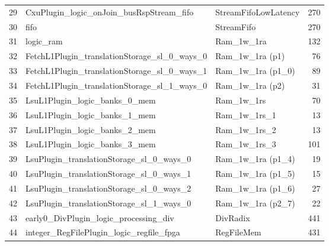 \begin{table}[!htbp]
\begin{tabular}{rllr}
29 & \quad\quad\quad CxuPlugin\_logic\_onJoin\_busRspStream\_fifo        & StreamFifoLowLatency                             &    270 \\
30 & \quad\quad\quad\quad fifo                                           & StreamFifo                                       &    270 \\
31 & \quad\quad\quad\quad\quad logic\_ram                                & Ram\_1w\_1ra                                     &    132 \\
32 & \quad\quad\quad FetchL1Plugin\_translationStorage\_sl\_0\_ways\_0   & Ram\_1w\_1ra (p1)                                &     76 \\
33 & \quad\quad\quad FetchL1Plugin\_translationStorage\_sl\_0\_ways\_1   & Ram\_1w\_1ra (p1\_0)                             &     89 \\
34 & \quad\quad\quad FetchL1Plugin\_translationStorage\_sl\_1\_ways\_0   & Ram\_1w\_1ra (p2)                                &     31 \\
35 & \quad\quad\quad LsuL1Plugin\_logic\_banks\_0\_mem                   & Ram\_1w\_1rs                                     &     70 \\
36 & \quad\quad\quad LsuL1Plugin\_logic\_banks\_1\_mem                   & Ram\_1w\_1rs\_1                                  &     13 \\
37 & \quad\quad\quad LsuL1Plugin\_logic\_banks\_2\_mem                   & Ram\_1w\_1rs\_2                                  &     13 \\
38 & \quad\quad\quad LsuL1Plugin\_logic\_banks\_3\_mem                   & Ram\_1w\_1rs\_3                                  &    101 \\
39 & \quad\quad\quad LsuPlugin\_translationStorage\_sl\_0\_ways\_0       & Ram\_1w\_1ra (p1\_4)                             &     19 \\
40 & \quad\quad\quad LsuPlugin\_translationStorage\_sl\_0\_ways\_1       & Ram\_1w\_1ra (p1\_5)                             &     15 \\
41 & \quad\quad\quad LsuPlugin\_translationStorage\_sl\_0\_ways\_2       & Ram\_1w\_1ra (p1\_6)                             &     27 \\
42 & \quad\quad\quad LsuPlugin\_translationStorage\_sl\_1\_ways\_0       & Ram\_1w\_1ra (p2\_7)                             &     22 \\
43 & \quad\quad\quad early0\_DivPlugin\_logic\_processing\_div           & DivRadix                                         &    441 \\
44 & \quad\quad\quad integer\_RegFilePlugin\_logic\_regfile\_fpga        & RegFileMem                                       &    431 \\
\bottomrule
\end{tabular}
\end{table}

